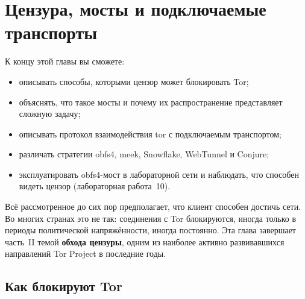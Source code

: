 \chapter{Цензура, мосты и подключаемые транспорты}\label{cap:16-censura}

\begin{obiettivi}
К концу этой главы вы сможете:
\begin{itemize}[nosep]
  \item описывать способы, которыми цензор может блокировать Tor;
  \item объяснять, что такое мосты и почему их распространение представляет сложную задачу;
  \item описывать протокол взаимодействия tor с подключаемым транспортом;
  \item различать стратегии obfs4, meek, Snowflake, WebTunnel и Conjure;
  \item эксплуатировать obfs4-мост в лабораторной сети и наблюдать, что способен видеть цензор (лабораторная работа~10).
\end{itemize}
\end{obiettivi}

Всё рассмотренное до сих пор предполагает, что клиент способен достичь сети. Во многих странах это не так: соединения с Tor блокируются, иногда только в периоды политической напряжённости, иногда постоянно. Эта глава завершает часть~II темой \textbf{обхода цензуры}, одним из наиболее активно развивавшихся направлений Tor Project в последние годы.

\section{Как блокируют Tor}\label{sec:cens-blocco}

